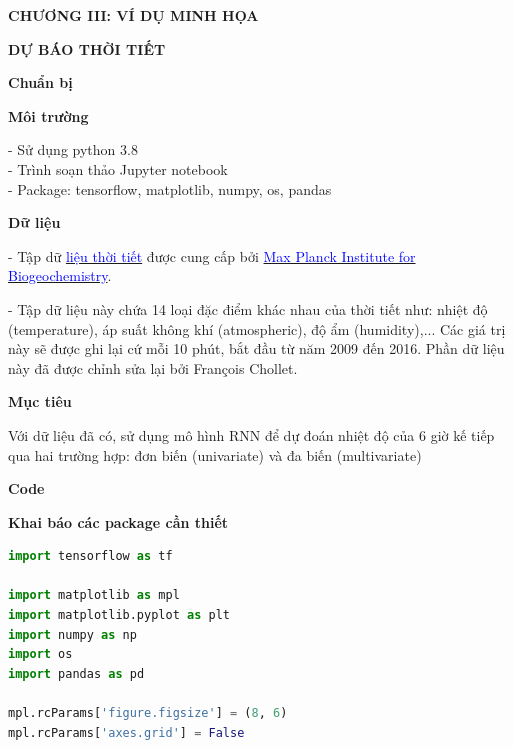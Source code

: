 
\newpage
\changefontsizes{16pt}
\centerline{\textbf{CHƯƠNG III: VÍ DỤ MINH HỌA}}
\centerline{\textbf{DỰ BÁO THỜI TIẾT}}

\vspace{1cm}
\changefontsizes{15pt}
\setlength{\parindent}{0cm}
\textbf{Chuẩn bị}

\vspace{0.25cm}
\changefontsizes{14pt}
\setlength{\parindent}{0cm}
\textbf{Môi trường}

\vspace{0.5cm}
\changefontsizes{13pt}
- Sử dụng python 3.8\\
- Trình soạn thảo Jupyter notebook\\
- Package: tensorflow, matplotlib, numpy, os, pandas


\vspace{0.75cm}
\changefontsizes{14pt}
\setlength{\parindent}{0cm}
\textbf{Dữ liệu}


\vspace{0.5cm}
\changefontsizes{13pt}
- Tập dữ \href{https://www.bgc-jena.mpg.de/wetter/}{\textcolor{blue}{liệu thời tiết}} được cung cấp bởi  \href{https://www.bgc-jena.mpg.de/index.php/Main/HomePage}{\textcolor{blue}{Max Planck Institute for Biogeochemistry}}.

\bigskip
- Tập dữ liệu này chứa 14 loại đặc điểm khác nhau của thời tiết như: nhiệt độ (temperature), áp suất không khí (atmospheric), độ ẩm (humidity),... Các giá trị này sẽ được ghi lại cứ mỗi 10 phút, bắt đầu từ năm 2009 đến 2016. Phần dữ liệu này đã được chỉnh sửa lại bởi François Chollet.

\vspace{0.75cm}
\changefontsizes{15pt}
\setlength{\parindent}{0cm}
\textbf{Mục tiêu}


\vspace{0.5cm}
\changefontsizes{13pt}
Với dữ liệu đã có, sử dụng mô hình RNN để dự đoán nhiệt độ của 6 giờ kế tiếp qua hai trường hợp: đơn biến (univariate) và đa biến (multivariate)


\vspace{0.75cm}
\changefontsizes{15pt}
\setlength{\parindent}{0cm}
\textbf{Code}


\vspace{0.25cm}
\changefontsizes{14pt}
\setlength{\parindent}{0cm}
\textbf{Khai báo các package cần thiết}

\begin{lstlisting}[language=Python]
import tensorflow as tf

import matplotlib as mpl
import matplotlib.pyplot as plt
import numpy as np
import os
import pandas as pd

mpl.rcParams['figure.figsize'] = (8, 6)
mpl.rcParams['axes.grid'] = False
\end{lstlisting}


